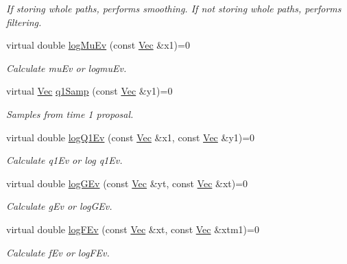 \begin{DoxyCompactItemize}
\begin{DoxyCompactList}\small\item\em If storing whole paths, performs smoothing. If not storing whole paths, performs filtering. \end{DoxyCompactList}\item 
virtual double \hyperlink{classSISRFilter_ab6ffa8e1cdee34f1afb825e35462afaa}{log\+Mu\+Ev} (const \hyperlink{pmfs_8h_a4c7df05c6f5e8a0d15ae14bcdbc07152}{Vec} \&x1)=0
\begin{DoxyCompactList}\small\item\em Calculate mu\+Ev or logmu\+Ev. \end{DoxyCompactList}\item 
virtual \hyperlink{pmfs_8h_a4c7df05c6f5e8a0d15ae14bcdbc07152}{Vec} \hyperlink{classSISRFilter_a5a57cd67535e31bb1ab20fb42499f911}{q1\+Samp} (const \hyperlink{pmfs_8h_a4c7df05c6f5e8a0d15ae14bcdbc07152}{Vec} \&y1)=0
\begin{DoxyCompactList}\small\item\em Samples from time 1 proposal. \end{DoxyCompactList}\item 
virtual double \hyperlink{classSISRFilter_a61a1971bd8208abbe3ccbacd66d35c23}{log\+Q1\+Ev} (const \hyperlink{pmfs_8h_a4c7df05c6f5e8a0d15ae14bcdbc07152}{Vec} \&x1, const \hyperlink{pmfs_8h_a4c7df05c6f5e8a0d15ae14bcdbc07152}{Vec} \&y1)=0
\begin{DoxyCompactList}\small\item\em Calculate q1\+Ev or log q1\+Ev. \end{DoxyCompactList}\item 
virtual double \hyperlink{classSISRFilter_aac59b077648fa74d2a5db970e3d7ffac}{log\+G\+Ev} (const \hyperlink{pmfs_8h_a4c7df05c6f5e8a0d15ae14bcdbc07152}{Vec} \&yt, const \hyperlink{pmfs_8h_a4c7df05c6f5e8a0d15ae14bcdbc07152}{Vec} \&xt)=0
\begin{DoxyCompactList}\small\item\em Calculate g\+Ev or log\+G\+Ev. \end{DoxyCompactList}\item 
virtual double \hyperlink{classSISRFilter_ab91474fc79efb84ed1dafbc8c542f59e}{log\+F\+Ev} (const \hyperlink{pmfs_8h_a4c7df05c6f5e8a0d15ae14bcdbc07152}{Vec} \&xt, const \hyperlink{pmfs_8h_a4c7df05c6f5e8a0d15ae14bcdbc07152}{Vec} \&xtm1)=0
\begin{DoxyCompactList}\small\item\em Calculate f\+Ev or log\+F\+Ev. \end{DoxyCompactList}\item 

\end{DoxyCompactItemize}
